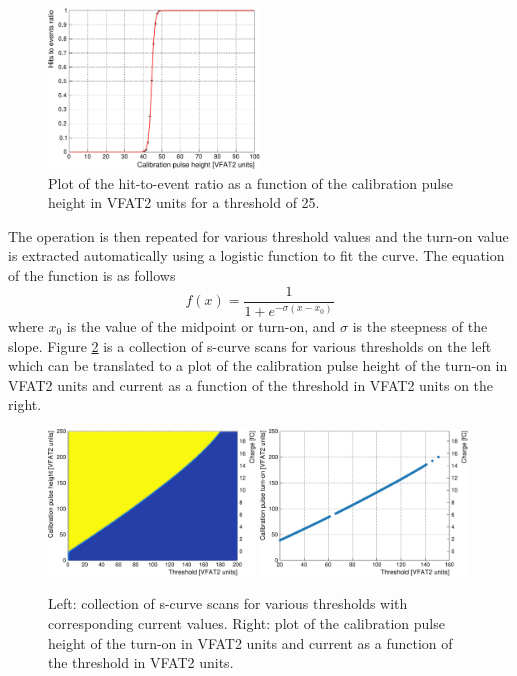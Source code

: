       \begin{figure}[h!]
        \centering
        \includegraphics[width=0.5\textwidth]{img/plots/cSCurve_T25-crop}
        \caption{Plot of the hit-to-event ratio as a function of the calibration pulse height in VFAT2 units for a threshold of 25.}
        \label{fig:II-4-scurve}
      \end{figure}

      The operation is then repeated for various threshold values and the turn-on value is extracted automatically using a logistic function to fit the curve. The equation of the function is as follows
      \begin{equation}
        \label{eq:II-4-logistic}
        f(x) = \frac{1}{1 + e^{-\sigma \left( x - x_0 \right)}}
      \end{equation}
      where $ x_0 $ is the value of the midpoint or turn-on, and $ \sigma $ is the steepness of the slope. Figure \ref{fig:II-4-scurves} is a collection of s-curve scans for various thresholds on the left which can be translated to a plot of the calibration pulse height of the turn-on in VFAT2 units and current as a function of the threshold in VFAT2 units on the right. \\

      \begin{figure}[h!]
        \centering
        \includegraphics[width=0.49\textwidth]{img/plots/cSCurve_ThresholdVCal-crop}
        \includegraphics[width=0.49\textwidth]{img/plots/cSCurve_TurnOn-crop}
        \caption{Left: collection of s-curve scans for various thresholds with corresponding current values. Right: plot of the calibration pulse height of the turn-on in VFAT2 units and current as a function of the threshold in VFAT2 units.}
        \label{fig:II-4-scurves}
      \end{figure}

